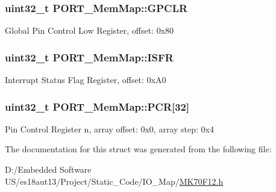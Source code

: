 \subsubsection[{G\+P\+C\+L\+R}]{\setlength{\rightskip}{0pt plus 5cm}uint32\+\_\+t P\+O\+R\+T\+\_\+\+Mem\+Map\+::\+G\+P\+C\+L\+R}\label{struct_p_o_r_t___mem_map_a837c289643f8cec958b1f01c086b558a}
Global Pin Control Low Register, offset\+: 0x80 \hypertarget{struct_p_o_r_t___mem_map_a53c86a08f430dc915a312efe74ba83e6}{}
\subsubsection[{I\+S\+F\+R}]{\setlength{\rightskip}{0pt plus 5cm}uint32\+\_\+t P\+O\+R\+T\+\_\+\+Mem\+Map\+::\+I\+S\+F\+R}\label{struct_p_o_r_t___mem_map_a53c86a08f430dc915a312efe74ba83e6}
Interrupt Status Flag Register, offset\+: 0x\+A0 \hypertarget{struct_p_o_r_t___mem_map_a1c54a8f1741fade8daf28198fee43ddd}{}
\subsubsection[{P\+C\+R}]{\setlength{\rightskip}{0pt plus 5cm}uint32\+\_\+t P\+O\+R\+T\+\_\+\+Mem\+Map\+::\+P\+C\+R\mbox{[}32\mbox{]}}\label{struct_p_o_r_t___mem_map_a1c54a8f1741fade8daf28198fee43ddd}
Pin Control Register n, array offset\+: 0x0, array step\+: 0x4 

The documentation for this struct was generated from the following file\+:\begin{DoxyCompactItemize}
\item 
D\+:/\+Embedded Software U\+S/es18aut13/\+Project/\+Static\+\_\+\+Code/\+I\+O\+\_\+\+Map/\hyperlink{_m_k70_f12_8h}{M\+K70\+F12.\+h}\end{DoxyCompactItemize}
